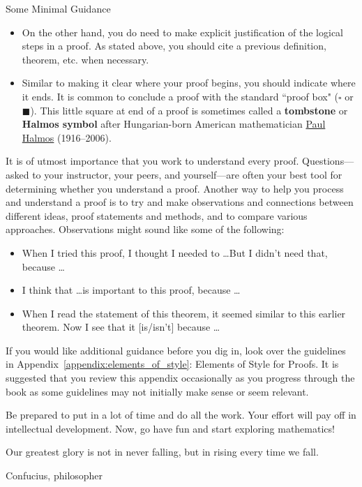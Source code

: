 \begin{section}{Some Minimal Guidance}
\begin{itemize}
\item On the other hand, you do need to make explicit justification of the logical steps in a proof.  As stated above, you should cite a previous definition, theorem, etc. when necessary.
\item Similar to making it clear where your proof begins, you should indicate where it ends.  It is common to conclude a proof with the standard ``proof box" ($\square$ or $\blacksquare$).  This little square at end of a proof is sometimes called a \textbf{tombstone} or \textbf{Halmos symbol} after Hungarian-born American mathematician \href{https://en.wikipedia.org/wiki/Paul_Halmos}{Paul Halmos} (1916--2006).
\end{itemize}

It is of utmost importance that you work to understand every proof.  Questions---asked to your instructor, your peers, and yourself---are often your best tool for determining whether you understand a proof.  Another way to help you process and understand a proof is to try and make observations and connections between different ideas, proof statements and methods, and to compare various approaches. Observations might sound like some of the following:
\begin{itemize}
\item When I tried this proof, I thought I needed to \ldots But I didn't need that, because \ldots
\item I think that \ldots is important to this proof, because \ldots
\item When I read the statement of this theorem, it seemed similar to this earlier theorem. Now I see that it [is/isn't] because \ldots
\end{itemize}

If you would like additional guidance before you dig in, look over the guidelines in Appendix~\ref{appendix:elements_of_style}: Elements of Style for Proofs. It is suggested that you review this appendix occasionally as you progress through the book as some guidelines may not initially make sense or seem relevant. 

Be prepared to put in a lot of time and do all the work. Your effort will pay off in intellectual development. Now, go have fun and start exploring mathematics!

\epigraph{Our greatest glory is not in never falling, but in rising every time we fall.}{Confucius, philosopher}

\end{section}

